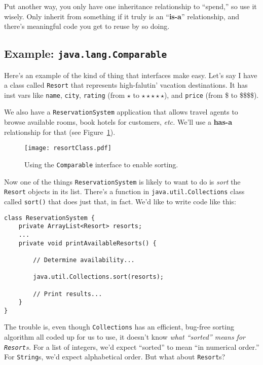 Put another way, you only have one inheritance relationship to ``spend,'' so
use it wisely. Only inherit from something if it truly is an ``\textbf{is-a}''
relationship, and there's meaningful code you get to reuse by so doing.

\subsection{Example: \texttt{java.lang.Comparable}}

Here's an example of the kind of thing that interfaces make easy. Let's say I
have a class called \texttt{Resort} that represents high-falutin' vacation
destinations. It has inst vars like \texttt{name}, \texttt{city},
\texttt{rating} (from $\star$ to $\star\star\star\star\star$), and
\texttt{price} (from \$ to \$\$\$\$).

We also have a \texttt{ReservationSystem} application that allows travel
agents to browse available rooms, book hotels for customers, \textit{etc.}
We'll use a \textbf{has-a} relationship for that (see
Figure~\ref{fig:resortClass}).

\begin{figure}[ht]
\centering
\texttt{[image: resortClass.pdf]}
\caption{Using the \texttt{Comparable} interface to enable sorting.}
\label{fig:resortClass}
\end{figure}

Now one of the things \texttt{ReservationSystem} is likely to want to do is
\textit{sort} the \texttt{Resort} objects in its list. There's a function in
\texttt{java.util.Collections} class called \texttt{sort()} that does just
that, in fact. We'd like to write code like this:

\begin{Verbatim}[fontsize=\small,samepage=true,frame=single]
class ReservationSystem {
    private ArrayList<Resort> resorts;
    ...
    private void printAvailableResorts() {

        // Determine availability...

        java.util.Collections.sort(resorts);

        // Print results...
    }
}
\end{Verbatim}

The trouble is, even though \texttt{Collections} has an efficient, bug-free
sorting algorithm all coded up for us to use, it doesn't know \textit{what
``sorted'' means for \texttt{Resort}s.} For a list of integers, we'd expect
``sorted'' to mean ``in numerical order.'' For \texttt{String}s, we'd expect
alphabetical order. But what about \texttt{Resort}s?

